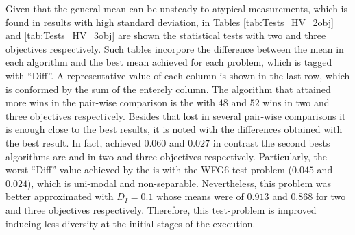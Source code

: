 Given that the general mean can be unsteady to atypical measurements, which is found in results with high standard deviation, in Tables \ref{tab:Tests_HV_2obj} and \ref{tab:Tests_HV_3obj} are shown the statistical tests with two and three objectives respectively.
%
Such tables incorpore the difference between the mean in each algorithm and the best mean achieved for each problem, which is tagged with ``Diff''.
%
A representative value of each column is shown in the last row, which is conformed by the sum of the enterely column.
%
The algorithm that attained more wins in the pair-wise comparison is the \VSDMOEA{} with $48$ and $52$ wins in two and three objectives respectively.
%
Besides that \VSDMOEA{} lost in several pair-wise comparisons it is enough close to the best results, it is noted with the differences obtained with the best result.
%
In fact, \VSDMOEA{} achieved $0.060$ and $0.027$ in contrast the second bests algorithms are \NSGAII{} and \RMOEA{} in two and three objectives respectively.
%
Particularly, the worst ``Diff'' value achieved by the \VSDMOEA{} is with the WFG6 test-problem ($0.045$ and $0.024$), which is uni-modal and non-separable.
%
Nevertheless, this problem was better approximated with $D_I=0.1$ whose means were of $0.913$ and $0.868$ for two and three objectives respectively.
%
Therefore, this test-problem is improved inducing less diversity at the initial stages of the execution.
%

%

%
%

